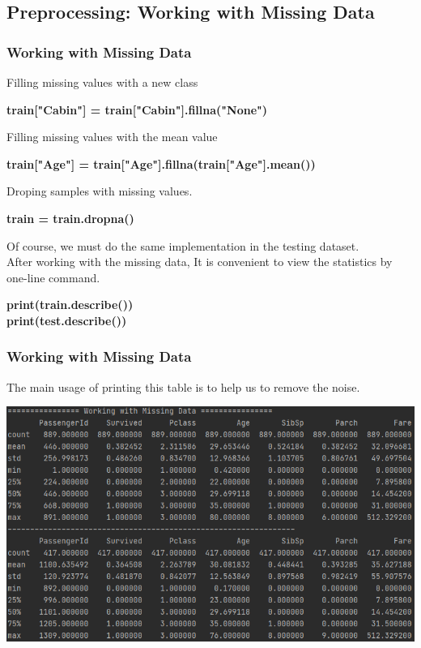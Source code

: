 \documentclass{beamer}
\begin{document}
\subsection{Preprocessing: Working with Missing Data}
\begin{frame}
	\frametitle{Working with Missing Data}
	\begin{flushleft}
		Filling missing values with a new class
	\end{flushleft}
	\begin{center}
		\textbf{\color{blue}train["Cabin"] = train["Cabin"].fillna("None")}
	\end{center}
	\begin{flushleft}
		Filling missing values with the mean value
	\end{flushleft}
	\begin{center}
		\textbf{\color{blue}train["Age"] = train["Age"].fillna(train["Age"].mean())}
	\end{center}
	\begin{flushleft}
		Droping samples with missing values.
	\end{flushleft}
	\begin{center}
		\textbf{\color{blue}train = train.dropna()}
	\end{center}
	\begin{flushleft}
		Of course, we must do the same implementation in the testing dataset. \\
		After working with the missing data, It is convenient to view the statistics by one-line command.
	\end{flushleft}
	\begin{center}
		\textbf{\color{blue}print(train.describe()) \\ print(test.describe())}
	\end{center}
\end{frame}

\begin{frame}
	\frametitle{Working with Missing Data}
	\begin{flushleft}
		The main usage of printing this table is to help us to remove the noise.
	\end{flushleft}
	\begin{center}
		\includegraphics[width=0.9\linewidth]{./src/figures/2.png}
	\end{center}
\end{frame}
\end{document}
